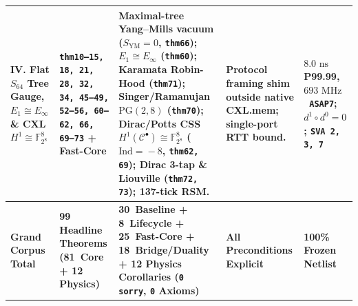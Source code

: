 \documentclass[11pt,letterpaper]{article}
\providecommand{\LeanTheoremTotal}{81}
\providecommand{\LeanPartOneTotal}{30}
\providecommand{\LeanNewExpansion}{8}
\providecommand{\LeanFastCoreTotal}{25}
\providecommand{\LeanBridgeTotal}{18}
\providecommand{\AsicFmaxMhz}{\ensuremath{693\text{~MHz}}}
\theoremstyle{spectralthm}
\begin{document}
\begin{table}[!htp]
\begin{tabularx}{\textwidth}{@{}>{\raggedright\arraybackslash}p{2.90cm} >{\raggedright\arraybackslash}p{2.85cm} >{\raggedright\arraybackslash}X >{\raggedright\arraybackslash}p{2.85cm} >{\raggedright\arraybackslash}p{2.25cm}@{}}
\addlinespace[3pt]
\textbf{IV. Flat $S_{64}$ Tree Gauge, $E_1\!\cong\!E_\infty$ \& CXL $H^1\!\cong\!\mathbb{F}_{2^8}^8$} & \texttt{thm10--15, 18, 21, 28, 32, 34, 45--49, 52--56, 60--62, 66, 69--73} + Fast-Core & Maximal-tree Yang--Mills vacuum ($S_{\mathrm{YM}}\!=\!0$, \texttt{thm66}); $E_1\!\cong\!E_\infty$ (\texttt{thm60}); Karamata Robin-Hood (\texttt{thm71}); Singer/Ramanujan $\mathrm{PG}(2,8)$ (\texttt{thm70}); Dirac/Potts CSS $H^1(\mathcal{C}^\bullet)\!\cong\!\mathbb{F}_{2^8}^8$ ($\mathrm{Ind}\!=\!-8$, \texttt{thm62, 69}); Dirac 3-tap \& Liouville (\texttt{thm72, 73}); 137-tick RSM. & Protocol framing shim outside native CXL.mem; single-port RTT bound. & $8.0\text{~ns}$ P99.99, \AsicFmaxMhz\ \texttt{ASAP7}; $d^1\circ d^0 = 0$; \texttt{SVA 2, 3, 7} \\
\midrule
\textbf{Grand Corpus Total} & \textbf{99 Headline Theorems (\LeanTheoremTotal\ Core + 12 Physics)} & \textbf{\LeanPartOneTotal\ Baseline + \LeanNewExpansion\ Lifecycle + \LeanFastCoreTotal\ Fast-Core + \LeanBridgeTotal\ Bridge/Duality + 12 Physics Corollaries (\texttt{0 sorry}, \texttt{0} Axioms)} & \textbf{All Preconditions Explicit} & \textbf{100\% Frozen Netlist} \\
\bottomrule
\end{tabularx}
\end{table}
\end{document}
